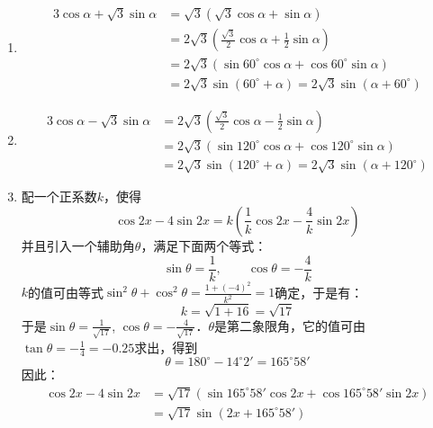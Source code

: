 \begin{solution}
\begin{enumerate}
    \item \[\begin{split}
3\cos\alpha+\sqrt{3}\sin\alpha &=\sqrt{3}\left(\sqrt{3}\cos\alpha+\sin\alpha\right)\\
&=2\sqrt{3}\left(\frac{\sqrt{3}}{2}\cos\alpha+\frac{1}{2}\sin\alpha\right)\\
&=2\sqrt{3}\left(\sin60^{\circ}\cos\alpha+\cos60^{\circ}\sin\alpha\right)\\
&=2\sqrt{3}\sin(60^{\circ}+\alpha)=2\sqrt{3}\sin (\alpha+60^{\circ})        
    \end{split}\]

    \begin{figure}[htp]
        \centering
        \caption{}
    \end{figure}

    \item \[\begin{split}
 3\cos\alpha-\sqrt{3}\sin\alpha&=2\sqrt{3}\left(\frac{\sqrt{3}}{2}\cos\alpha-\frac{1}{2}\sin\alpha\right)\\       
 &=2\sqrt{3}\left(\sin120^{\circ}\cos\alpha+\cos120^{\circ}\sin\alpha\right)\\
 &=2\sqrt{3}\sin(120^{\circ}+\alpha)=2\sqrt{3}\sin (\alpha+120^{\circ})      
    \end{split}\]
    \item 配一个正系数$k$，使得
\[\cos 2x-4\sin 2x=k\left(\frac{1}{k}\cos2x-\frac{4}{k}\sin 2x\right)\]    
    并且引入一个辅助角$\theta$，满足下面两个等式：
\[\sin\theta=\frac{1}{k},\qquad \cos\theta=-\frac{4}{k}\]
$k$的值可由等式$\sin^2\theta+\cos^2\theta=\frac{1+(-4)^2}{k^2}=1$确定，于是有：
\[k=\sqrt{1+16}=\sqrt{17}\]
于是$\sin\theta=\frac{1}{\sqrt{17}}$, $\cos\theta=-\frac{4}{\sqrt{17}}$．$\theta$是第二象限角，它的值可由$\tan\theta=-\frac{1}{4}=-0.25$求出，得到
\[\theta=180^{\circ}-14^{\circ}2'=165^{\circ}58'\]
因此：
    \[\begin{split}
 \cos 2x-4\sin 2x&=\sqrt{17}\left(\sin165^{\circ}58'\cos 2x+\cos165^{\circ}58'\sin2x \right)       \\
 &=\sqrt{17}\sin (2x+165^{\circ}58')
    \end{split}\]
\end{enumerate}     
\end{solution}

